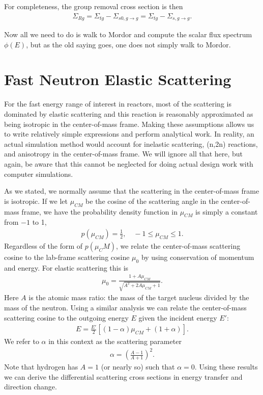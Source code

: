 For completeness, the group removal cross section is then
\begin{align}
  \Sigma_{Rg} = \Sigma_{tg} - \Sigma_{s0,g \rightarrow g} = \Sigma_{tg} - \Sigma_{s,g \rightarrow g}.
\end{align}

Now all we need to do is walk to Mordor and compute the scalar flux spectrum $\phi(E)$, but as the old saying goes, one does not simply walk to Mordor.

\section{Fast Neutron Elastic Scattering}

For the fast energy range of interest in reactors, most of the scattering is dominated by elastic scattering and this reaction is reasonably approximated as being isotropic in the center-of-mass frame. Making these assumptions allows us to write relatively simple expressions and perform analytical work. In reality, an actual simulation method would account for inelastic scattering, (n,2n) reactions, and anisotropy in the center-of-mass frame. We will ignore all that here, but again, be aware that this cannot be neglected for doing actual design work with computer simulations.

As we stated, we normally assume that the scattering in the center-of-mass frame is isotropic. If we let $\mu_{CM}$ be the cosine of the scattering angle in the center-of-mass frame, we have the probability density function in $\mu_{CM}$ is simply a constant from $-1$ to 1,
\begin{align}
  p(\mu_{CM}) = \frac{1}{2}, \quad -1 \le \mu_{CM} \le 1 .
\end{align}
Regardless of the form of $p(\mu_CM)$, we relate the center-of-mass scattering cosine to the lab-frame scattering cosine $\mu_0$ by using conservation of momentum and energy. For elastic scattering this is
\begin{align}
  \mu_0 = \frac{ 1 + A \mu_{CM} }{ \sqrt{ A^2 + 2 A \mu_{CM} + 1 } } .
\end{align}
Here $A$ is the atomic mass ratio: the mass of the target nucleus divided by the mass of the neutron. Using a similar analysis we can relate the center-of-mass scattering cosine to the outgoing energy $E$ given the incident energy $E'$:
\begin{align}
  E = \frac{E'}{2} \left[ ( 1 - \alpha ) \mu_{CM} + ( 1 + \alpha) \right] .
\end{align}
We refer to $\alpha$ in this context as the scattering parameter
\begin{align}
  \alpha = \left( \frac{ A - 1 }{ A + 1 } \right)^2 .
\end{align}
Note that hydrogen has $A = 1$ (or nearly so) such that $\alpha = 0$. Using these results we can derive the differential scattering cross sections in energy transfer and direction change. 

